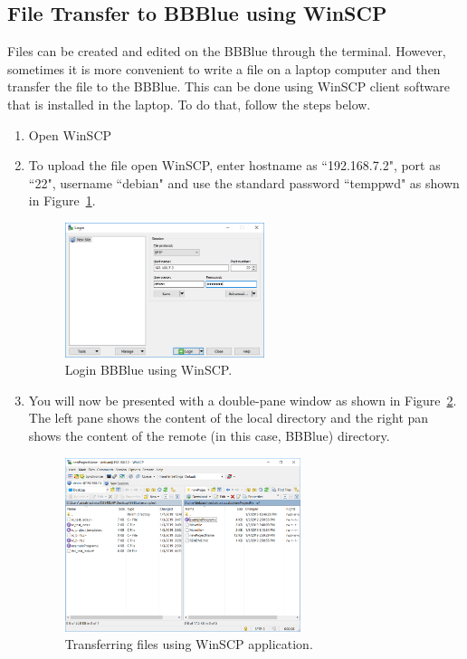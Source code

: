 \subsection{File Transfer to BBBlue using WinSCP} \label{FileTransferWinSCP}
Files can be created and edited on the BBBlue through the terminal. However, sometimes it is more convenient to write a file on a laptop computer and then transfer the file to the BBBlue. This can be done using WinSCP client software that is installed in the laptop. To do that, follow the steps below. 
%
\begin{enumerate}
    \item Open WinSCP
    
    \item  To upload the file open WinSCP, enter hostname as ``192.168.7.2", port as ``22", username ``debian" and use the standard password ``temppwd" as shown in Figure~\ref{fig:winSCPlogin}. %
    \begin{figure}
        \centering
        \includegraphics[width= 0.55\textwidth]{figs/img/Lab0/winSCP_login.png}
        \caption{Login BBBlue using WinSCP.}
        \label{fig:winSCPlogin}
    \end{figure}
    
    \item You will now be presented with a double-pane window as shown in Figure~\ref{fig:winApp}. The left pane shows the content of the local directory and the right pan shows the content of the remote (in this case, BBBlue) directory. %
    \begin{figure}
        \centering
        \includegraphics[width= 0.65\textwidth]{figs/img/Lab0/winSCP-C.PNG}        
        \caption{Transferring files using WinSCP application.}
        \label{fig:winApp}
    \end{figure}
    

\end{enumerate}

